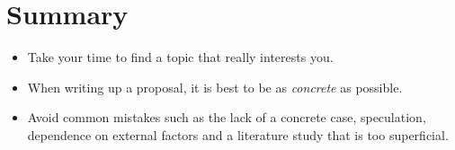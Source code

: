 \section{Summary}
\label{sec:subjectsummary}

\begin{itemize}
 \item Take your time to find a topic that really interests you.
 \item When writing up a proposal, it is best to be as \emph{concrete} as possible.
 \item Avoid common mistakes such as the lack of a concrete case, speculation, dependence on external factors and a literature study that is too superficial.
\end{itemize}
